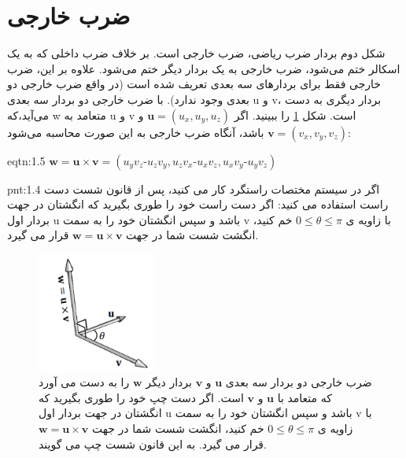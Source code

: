 \section{\textbf{ضرب خارجی}}
\label{sec:1.4}
{
    \Large
    \begin{spacing}{1.5}
        شکل دوم بردار ضرب ریاضی، ضرب خارجی است.
        بر خلاف ضرب داخلی که به یک اسکالر ختم می‌شود، ضرب خارجی به یک بردار دیگر ختم می‌شود.
        علاوه بر این، ضرب خارجی فقط برای بردارهای سه بعدی تعریف شده است (در واقع ضرب خارجی دو بعدی وجود ندارد).
        با ضرب خارجی دو بردار سه بعدی u و v، بردار دیگری به دست می‌آید،که w متعامد به u و v است.
        شکل \ref{fig:4.Session.1.1.13} را ببینید.
        اگر $\textbf{u}=(u_{x},u_{y},u_{z})$ و  $\textbf{v}=(v_{x},v_{y},v_{z})$ باشد، آنگاه ضرب خارجی به این صورت محاسبه می‌شود:

        \begin{eqtn}{eqtn:1.5}
            \centering
            $\textbf{w}=\textbf{u}\times\textbf{v}=(u_{y}v_{z}\textbf{-}u_{z}v_{y}, u_{z}v_{x}\textbf{-}u_{x}v_{z}, u_{x}v_{y}\textbf{-}u_{y}v_{z})$
        \end{eqtn}

        \begin{point}{pnt:1.4}
            \Large
            اگر در سیستم مختصات راستگرد کار می کنید، پس از قانون شست دست راست استفاده می کنید:
            اگر دست راست خود را طوری بگیرید که انگشتان در جهت بردار اول u باشد و سپس انگشتان خود را به سمت v با زاویه ی $0\leq\theta\leq\pi$ خم کنید، انگشت شست شما در جهت $\textbf{w}=\textbf{u}\times\textbf{v}$ قرار می گیرد.
        \end{point}

        \begin{figure}[H]
            \centering
            \setlength{\belowcaptionskip}{-10pt}
            \includegraphics[width=0.35\textwidth]{Images/4/1/4.Session.1.1.13}
            \caption{ضرب خارجی دو بردار سه بعدی $\textbf{u}$ و $\textbf{v}$ بردار دیگر $\textbf{w}$ را به دست می آورد که متعامد با $\textbf{u}$ و $\textbf{v}$ است.
            اگر دست چپ خود را طوری بگیرید که انگشتان در جهت بردار اول u باشد و سپس انگشتان خود را به سمت v با زاویه ی $0\leq\theta\leq\pi$ خم کنید، انگشت شست شما در جهت $\textbf{w}=\textbf{u}\times\textbf{v}$ قرار می گیرد. به این قانون شست چپ می گویند.}
            \label{fig:4.Session.1.1.13}
        \end{figure}


\end{spacing}}
